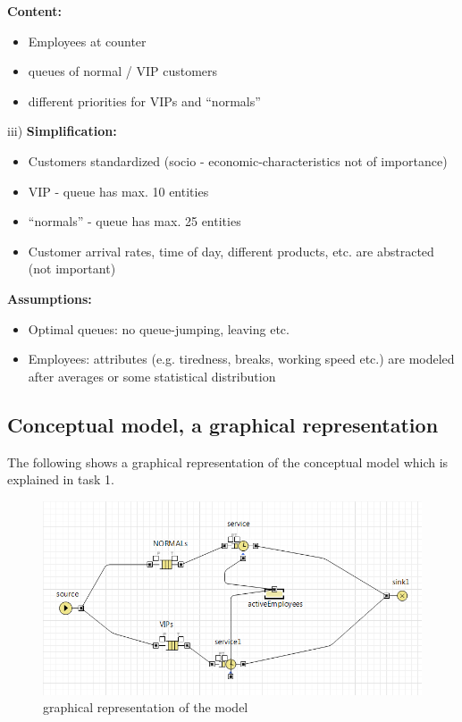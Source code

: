 	\textbf{Content:}
		\begin{itemize}	
		  \item Employees at counter
		  \item queues of normal / VIP customers
		  \item different priorities for VIPs and ``normals''
		  \end{itemize}

iii)
\textbf{Simplification:}
	\begin{itemize}
	  \item Customers standardized (socio - economic-characteristics not of importance)
	  \item VIP - queue has  max. 10 entities
	  \item ``normals'' - queue has max. 25 entities
	  \item Customer arrival rates, time of day, different products, etc. are abstracted (not important)
	\end{itemize}
	
\textbf{Assumptions:}
	\begin{itemize}
	  \item Optimal queues: no queue-jumping, leaving etc.
	  \item Employees: attributes  (e.g. tiredness, breaks, working speed etc.) are modeled after averages or some 
	        statistical distribution
	\end{itemize}


\subsection{Conceptual model, a graphical representation}
The following shows a graphical representation of the conceptual model which is explained  in task 1.
	\begin{figure}[!htb]
  \centering   
  \includegraphics[width=1\textwidth]{pics/ub4/dia} 
  \caption{graphical representation of the model}
  \label{fig:dia} 
 \end{figure}

